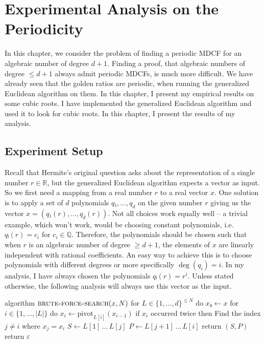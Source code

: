 \chapter{Experimental Analysis on the Periodicity}

In this chapter, we consider the problem of finding a periodic MDCF for an algebraic number of degree $d+1$.
Finding a proof, that algebraic numbers of degree $≤ d+1$ always admit periodic MDCFs, is much more difficult.
We have already seen that the golden ratios are periodic, when running the
generalized Euclidean algorithm on them.
In this chapter, I present my empirical results on some cubic roots.
I have implemented the generalized Euclidean algorithm and used it to look for
cubic roots.
In this chapter, I present the results of my analysis.

\section{Experiment Setup}

Recall that Hermite's original question asks about the representation of a
single number $r ∈ ℝ$, but the generalized Euclidean algorithm expects a vector
as input.
So we first need a mapping from a real number $r$ to a real vector $x$.
One solution is to apply a set of $d$ polynomials $q₁, …, q_d$ on the
given number $r$ giving us the vector $x = (q₁(r), …, q_d(r))$.
Not all choices work equally well -- a trivial example, which won't work, would
be choosing constant polynomials, i.e. $qᵢ(r) = c_i$ for $c_i ∈ ℚ$.
Therefore, the polynomials should be chosen such that when $r$ is an algebraic
number of degree $≥d+1$, the elements of $x$ are linearly independent with
rational coefficients.
An easy way to achieve this is to choose polynomials with different degrees or
more specifically $\deg(q_i) = i$.
In my analysis, I have always chosen the polynomials $qᵢ(r) = r^i$.
Unless stated otherwise, the following analysis will always use this vector as the input.

\begin{Pseudocode}[float=tbp, label={lst:bfs}, caption={The brute-force search algorithm for finding a periodic representation.}]
algorithm $\textsc{brute-force-search}(x, N)$
  for $L ∈ \{1, …, d\}^{≤ N}$ do
    $x₀ ← x$
    for $i ∈ \{1, …, |L|\}$ do
      $x_i ← \mathrm{pivot}_{L[i]}(x_{i-1})$
      if $x_i$ occurred twice then
        Find the index $j ≠ i$ where $x_j = x_i$
        $S ← L[1] \,…\, L[j]$
        $P ← L[j+1] \,…\, L[i]$
        return $(S, P)$
  return $ε$
\end{Pseudocode}

